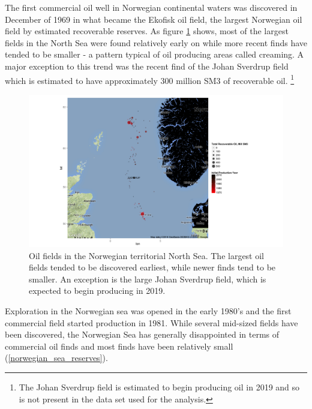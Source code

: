 \documentclass[12pt]{article}
\begin{document}
The first commercial oil well in Norwegian continental waters was discovered in December of 1969 in what became the Ekofisk oil field, the largest Norwegian oil field by estimated recoverable reserves.  As figure \ref{north_sea_reserves} shows, most of the largest fields in the North Sea were found relatively early on while more recent finds have tended to be smaller - a pattern typical of oil producing areas called creaming.  A major exception to this trend was the recent find of the Johan Sverdrup field which is estimated to have approximately 300 million SM3 of recoverable oil. \footnote{The Johan Sverdrup field is estimated to begin producing oil in 2019 and so is not present in the data set used for the analysis.}  

\begin{figure}
\includegraphics[width=1.2\textwidth]{figures/north_sea_reserves_print.png}
\caption{Oil fields in the Norwegian territorial North Sea.  The largest oil fields tended to be discovered earliest, while newer finds tend to be smaller.  An exception is the large Johan Sverdrup field, which is expected to begin producing in 2019.}
\label{north_sea_reserves}
\end{figure}

Exploration in the Norwegian sea was opened in the early 1980’s and the first commercial field started production in 1981.  While several mid-sized fields have been discovered, the Norwegian Sea has generally disappointed in terms of commercial oil finds and most finds have been relatively small (\ref{norwegian_sea_reserves}).  
\end{document}
